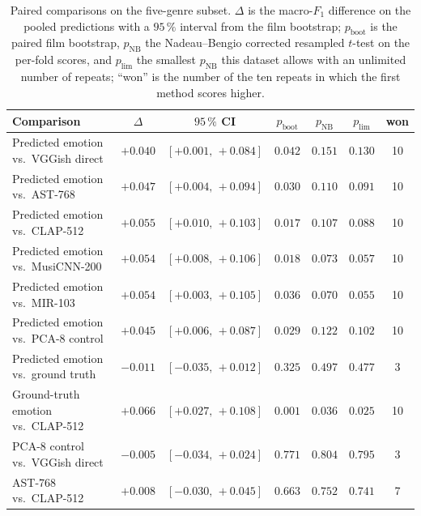 \begin{table}[t]
  \centering
  \caption{Paired comparisons on the five-genre subset. $\Delta$ is the macro-$F_1$
    difference on the pooled predictions with a $95\,\%$ interval from the film bootstrap;
    $p_{\text{boot}}$ is the paired film bootstrap, $p_{\text{NB}}$ the Nadeau--Bengio
    corrected resampled $t$-test on the per-fold scores, and $p_{\lim}$ the smallest
    $p_{\text{NB}}$ this dataset allows with an unlimited number of repeats; ``won'' is the
    number of the ten repeats in which the first method scores higher.}
  \label{tab:power_cmp}
  \begin{tabular}{lcccccc}
    \hline
    Comparison & $\Delta$ & $95\,\%$ CI & $p_{\text{boot}}$ & $p_{\text{NB}}$ & $p_{\lim}$ & won \\
    \hline
    Predicted emotion vs.\ VGGish direct & $+0.040$ & $[+0.001,\,+0.084]$ & $\mathbf{0.042}$ & $0.151$ & $0.130$ & 10 \\
    Predicted emotion vs.\ AST-768       & $+0.047$ & $[+0.004,\,+0.094]$ & $\mathbf{0.030}$ & $0.110$ & $0.091$ & 10 \\
    Predicted emotion vs.\ CLAP-512      & $+0.055$ & $[+0.010,\,+0.103]$ & $\mathbf{0.017}$ & $0.107$ & $0.088$ & 10 \\
    Predicted emotion vs.\ MusiCNN-200   & $+0.054$ & $[+0.008,\,+0.106]$ & $\mathbf{0.018}$ & $0.073$ & $0.057$ & 10 \\
    Predicted emotion vs.\ MIR-103       & $+0.054$ & $[+0.003,\,+0.105]$ & $\mathbf{0.036}$ & $0.070$ & $0.055$ & 10 \\
    Predicted emotion vs.\ PCA-8 control & $+0.045$ & $[+0.006,\,+0.087]$ & $\mathbf{0.029}$ & $0.122$ & $0.102$ & 10 \\
    Predicted emotion vs.\ ground truth  & $-0.011$ & $[-0.035,\,+0.012]$ & $0.325$ & $0.497$ & $0.477$ & 3 \\
    Ground-truth emotion vs.\ CLAP-512   & $+0.066$ & $[+0.027,\,+0.108]$ & $\mathbf{0.001}$ & $\mathbf{0.036}$ & $0.025$ & 10 \\
    PCA-8 control vs.\ VGGish direct     & $-0.005$ & $[-0.034,\,+0.024]$ & $0.771$ & $0.804$ & $0.795$ & 3 \\
    AST-768 vs.\ CLAP-512                & $+0.008$ & $[-0.030,\,+0.045]$ & $0.663$ & $0.752$ & $0.741$ & 7 \\
    \hline
  \end{tabular}
\end{table}

